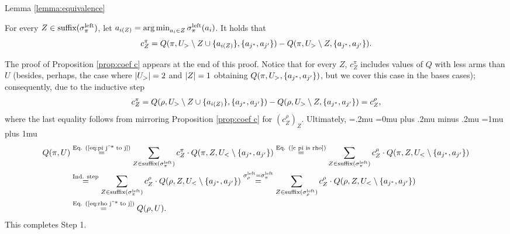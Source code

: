 \begin{proofof}{Lemma \ref{lemma:equivalence}}
\begin{proposition}\label{prop:coef c}
For every $Z\in \textnormal{suffix}(\sigma^{\textnormal{left}}_\pi)$, let $a_{i(Z)} = \operatorname*{arg\,min}_{a_i\in Z} \sigma^{\textnormal{left}}_\pi(a_i)$. It holds that
\[
c^\pi_Z = Q(\pi,U_>\setminus Z \cup \{a_{i(Z)}\}, \{a_{j^*},a_{j'}\})-Q(\pi,U_>\setminus Z, \{a_{j^*},a_{j'}\}).
\]
\end{proposition}
The proof of Proposition \ref{prop:coef c} appears at the end of this proof. Notice that for every $Z$, $c^\pi_Z$ includes values of $Q$ with less arms than $U$ (besides, perhaps, the case where $\left| U_> \right|=2$ and $\left| Z \right|=1$ obtaining $Q(\pi,U_>, \{a_{j^*},a_{j'}\})$, but we cover this case in the bases cases); consequently, due to the inductive step
\begin{align}\label{c pi is rho}
c^\pi_Z = Q(\rho,U_>\setminus Z \cup \{a_{i(Z)}\}, \{a_{j^*},a_{j'}\})-Q(\rho,U_>\setminus Z, \{a_{j^*},a_{j'}\})=c^\rho_Z,
\end{align}
where the last equality follows from mirroring Proposition \ref{prop:coef c} for $(c^\rho_Z)_Z$. Ultimately,
{\thinmuskip=.2mu
\medmuskip=0mu plus .2mu minus .2mu
\thickmuskip=1mu plus 1mu
\begin{align*}
Q(\pi,U) &\stackrel{\textnormal{Eq. (\ref{eq:pi j^* to j})}}{=}\sum_{Z \in \textnormal{suffix}(\sigma^{\textnormal{left}}_\pi)}c^\pi_Z \cdot Q(\pi,Z,U_<\setminus \{a_{j^*},a_{j'}\})\stackrel{\textnormal{Eq. (\ref{c pi is rho})}}{=}\sum_{Z \in \textnormal{suffix}(\sigma^{\textnormal{left}}_\pi)}c^\rho_Z \cdot Q(\pi,Z,U_<\setminus \{a_{j^*},a_{j'}\}) \nonumber\\
&\stackrel{\textnormal{Ind. step}}{=}\sum_{Z \in \textnormal{suffix}(\sigma^{\textnormal{left}}_\pi)}c^\rho_Z \cdot Q(\rho,Z,U_<\setminus \{a_{j^*},a_{j'}\}) \stackrel{\sigma^{\textnormal{left}}_{\rho}=\sigma^{\textnormal{left}}_\pi}{=}\sum_{Z \in \textnormal{suffix}(\sigma^{\textnormal{left}}_\rho)}c^\rho_Z \cdot Q(\rho,Z,U_<\setminus \{a_{j^*},a_{j'}\}) \nonumber\\
&\stackrel{\textnormal{Eq. (\ref{eq:rho j^* to j})}}{=}Q(\rho,U) .
\end{align*}}
This completes Step 1.


\end{proofof}
